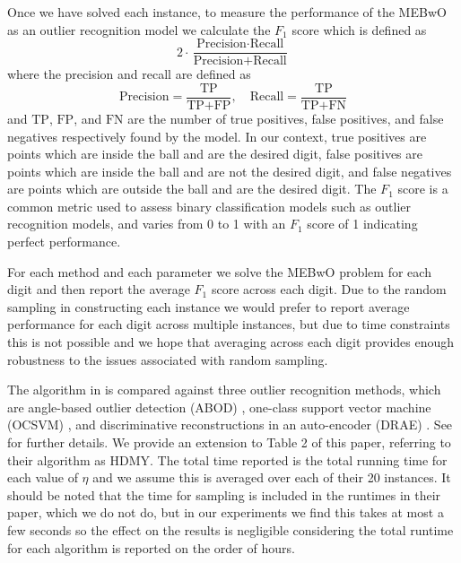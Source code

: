 \documentclass[11pt,twoside]{report}
\theoremstyle{definition}
\numberwithin{theorem}{section}
\numberwithin{definition}{section}
\numberwithin{lemma}{section}
\numberwithin{proposition}{section}
\numberwithin{equation}{section}
\numberwithin{figure}{section}
\begin{document}
Once we have solved each instance, to measure the performance of the MEBwO as an outlier recognition model we calculate the $F_1$ score which is defined as
\begin{equation*}
    2\cdot\frac{\text{Precision}\cdot\text{Recall}}{\text{Precision}+\text{Recall}}
\end{equation*}
where the precision and recall are defined as 
\begin{equation*}
    \text{Precision} = \frac{\text{TP}}{\text{TP} + \text{FP}},\quad \text{Recall} = \frac{\text{TP}}{\text{TP}+\text{FN}}
\end{equation*}
and $\text{TP}$, $\text{FP}$, and $\text{FN}$ are the number of true positives, false positives, and false negatives respectively found by the model. In our context, true positives are points which are inside the ball and are the desired digit, false positives are points which are inside the ball and are not the desired digit, and false negatives are points which are outside the ball and are the desired digit. The $F_1$ score is a common metric used to assess binary classification models such as outlier recognition models, and varies from 0 to 1 with an $F_1$ score of 1 indicating perfect performance.

For each method and each parameter we solve the MEBwO problem for each digit and then report the average $F_1$ score across each digit. Due to the random sampling in constructing each instance we would prefer to report average performance for each digit across multiple instances, but due to time constraints this is not possible and we hope that averaging across each digit provides enough robustness to the issues associated with random sampling.

The algorithm in \cite{huding} is compared against three outlier recognition methods, which are angle-based outlier detection (ABOD) \cite{abod}, one-class support vector machine (OCSVM) \cite{ocsvm}, and discriminative reconstructions in an auto-encoder (DRAE) \cite{drae}. See \cite{huding} for further details. We provide an extension to Table 2 of this paper, referring to their algorithm as HDMY. The total time reported is the total running time for each value of $\eta$ and we assume this is averaged over each of their 20 instances. It should be noted that the time for sampling is included in the runtimes in their paper, which we do not do, but in our experiments we find this takes at most a few seconds so the effect on the results is negligible considering the total runtime for each algorithm is reported on the order of hours.
\end{document}
